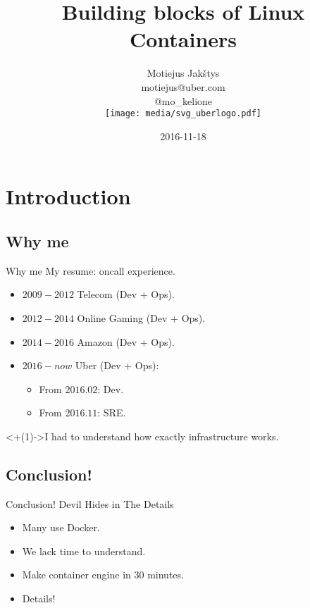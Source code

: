 \documentclass[14pt]{beamer}
\title{Building blocks of Linux Containers}
\author{Motiejus Jak\v{s}tys \\
    motiejus@uber.com \\
    @mo\_kelione \\
    \vspace{1em}
    \texttt{[image: media/svg\_uberlogo.pdf]}
}
\date{2016-11-18}
\begin{document}

\begin{frame}
\titlepage
\end{frame}

\section{Introduction}
\subsection{Why me}
\begin{frame}{Why me}
    My resume: {\tiny oncall experience.}
    \begin{itemize}
        \item $2009-2012$ Telecom (Dev + Ops).
        \item $2012-2014$ Online Gaming (Dev + Ops).
        \item $2014-2016$ Amazon (Dev + Ops).
        \item $2016-now$ Uber (Dev + Ops):
            \begin{itemize}
                \item From $2016.02$: Dev.
                \item From $2016.11$: SRE.
            \end{itemize}
    \end{itemize}
    \onslide<+(1)->{I had to understand how exactly infrastructure works.}
\end{frame}

\subsection{Conclusion!}
\begin{frame}{Conclusion!}
    \pause
    Devil Hides in The Details
    \begin{itemize}[<+->]
        \item Many use Docker.
        \item We lack time to understand.
        \item Make container engine in 30 minutes.
        \item Details! 
    \end{itemize}
\end{frame}
\end{document}
